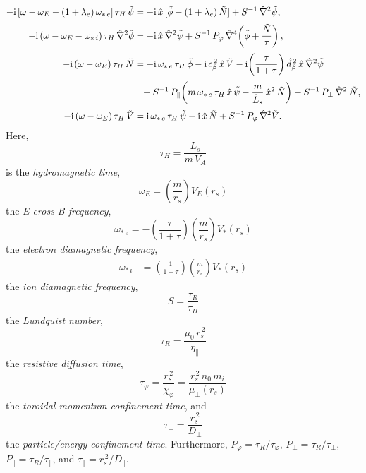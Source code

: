 \documentclass[notitlepage,12pt]{article}
\begin{document}
\begin{align}\label{e301}
-{\rm i}\,[\omega-\omega_E -(1+\lambda_e)\,\omega_{\ast\,e}]\,\tau_H\,\tilde{\psi} &= -{\rm i} \,\hat{x}\,[\tilde{\phi}-(1+\lambda_e)\,\tilde{N}] + S^{-1}\,\hat{\nabla}^2\tilde{\psi},\\[0.5ex]
-{\rm i}\,(\omega-\omega_E-\omega_{\ast\,i})\,\tau_H\,\hat{\nabla}^2\tilde{\phi} &= -{\rm i}\,\hat{x}\,\hat{\nabla}^2\tilde{\psi}+S^{-1}\,P_\varphi\,\hat{\nabla}^4\!\left(\tilde{\phi} + \frac{\tilde{N}}{\tau}\right),\\[0.5ex]
-{\rm i}\,(\omega-\omega_E)\,\tau_H\,\tilde{N} &= -{\rm i}\,\omega_{\ast\,e}\,\tau_H\,\tilde{\phi}-{\rm i}\,c_\beta^{\,2}\,\hat{x}\,\tilde{V} - {\rm i}\!\left(\frac{\tau}{1+\tau}\right)\hat{d}_\beta^{\,2}\,\hat{x}\,\hat{\nabla}^2\tilde{\psi} \\[0.5ex]
&\phantom{=}
+S^{-1}\,P_\parallel\!\left(m\,\omega_{\ast\,e}\,\tau_H\,\hat{x}\,\tilde{\psi}-\frac{m}{\hat{L}_s}\,\hat{x}^2\,\tilde{N}\right)
+ S^{-1}\,P_\perp\,\hat{\nabla}_\perp^2 \tilde{N},\nonumber\\[0.5ex]
-{\rm i}\,(\omega-\omega_E)\,\tau_H\,\tilde{V} &= {\rm i}\,\omega_{\ast\,e}\,\tau_H\,\tilde{\psi} - {\rm i}\,\hat{x}\,\tilde{N}
+ S^{-1}\,P_\varphi\,\hat{\nabla}^2\tilde{V}.\label{e304}
\end{align}
Here, 
\begin{equation}
\tau_H = \frac{L_s}{m\,V_A}
\end{equation}
is the {\em hydromagnetic time}, 
\begin{equation}
\omega_E = \left(\frac{m}{r_s}\right)V_E(r_s)
\end{equation}
  the 
{\em E-cross-B frequency}, 
\begin{equation}
\omega_{\ast\,e} = -\left(\frac{\tau}{1+\tau}\right)\left(\frac{m}{r_s}\right)V_\ast(r_s)
\end{equation}
  the {\em electron diamagnetic
frequency},
\begin{align}\label{omegai}
  \omega_{\ast\,i} &= \left(\frac{1}{1+\tau}\right)\left(\frac{m}{r_s}\right)V_\ast(r_s)
  \end{align}
    the {\em ion diamagnetic
frequency}, 
\begin{equation}
S=\frac{\tau_R}{\tau_H}
\end{equation}
 the {\em Lundquist number}, 
\begin{equation}\label{e317a}
\tau_R = \frac{\mu_0\,r_s^{\,2}}{\eta_\parallel}
\end{equation}
 the
{\em resistive diffusion time}, 
\begin{equation}\label{e318a}
\tau_\varphi
= \frac{r_s^{\,2}}{\chi_\varphi}=\frac{r_s^{\,2}\,n_0\,m_i}{\mu_\perp(r_s)}
\end{equation} 
the {\em toroidal momentum confinement time}, and 
\begin{equation}
\tau_\perp = \frac{r_s^{\,2}}{D_\perp}
\end{equation}
 the {\em particle/energy confinement time}. Furthermore, $P_\varphi = \tau_R/\tau_\varphi$, $P_\perp = \tau_R/\tau_\perp$, 
$P_\parallel=\tau_R/\tau_\parallel$, and $\tau_\parallel =r_s^{\,2}/D_\parallel$.
\end{document}
